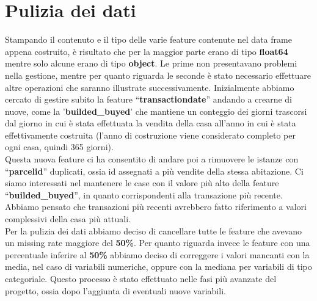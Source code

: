 \section*{Pulizia dei dati}
Stampando il contenuto e il tipo delle varie feature contenute nel data frame appena costruito, è risultato che per la maggior parte erano di tipo \textbf{float64} mentre solo alcune erano di tipo \textbf{object}. 
Le prime non presentavano problemi nella gestione, mentre per quanto riguarda le seconde è stato necessario effettuare altre operazioni che saranno illustrate successivamente. 
Inizialmente abbiamo cercato di gestire subito la feature ``\textbf{transactiondate}'' andando a crearne di nuove, come la '\textbf{builded\_buyed}' che mantiene un conteggio dei giorni trascorsi dal giorno in cui è stata effettuata la vendita della casa all'anno in cui è stata effettivamente
costruita (l'anno di costruzione viene considerato completo per ogni casa, quindi 365 giorni).\\
Questa nuova feature ci ha consentito di andare poi a rimuovere le istanze con ``\textbf{parcelid}'' duplicati, ossia id assegnati a più vendite della stessa abitazione. Ci siamo interessati nel mantenere le case con il valore più alto della feature ``\textbf{builded\_buyed}'', in quanto corrispondenti alla 
transazione più recente. Abbiamo pensato che transazioni più recenti avrebbero fatto riferimento a valori complessivi della casa più attuali.\\
Per la pulizia dei dati abbiamo deciso di cancellare tutte le feature che avevano un missing rate maggiore del \textbf{50\%}. Per quanto riguarda invece le feature con una percentuale inferire al \textbf{50\%} abbiamo deciso di correggere i valori mancanti con la media, nel caso di variabili numeriche, oppure con la mediana per variabili di tipo categoriale.
Questo processo è stato effettuato nelle fasi più avanzate del progetto, ossia dopo l'aggiunta di eventuali nuove variabili.

